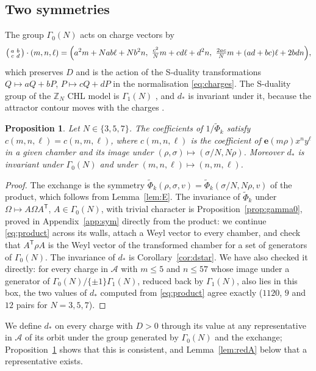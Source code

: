 \documentclass[11pt]{amsart}
\numberwithin{equation}{section}
\theoremstyle{plain}
\newtheorem{prop}[thm]{Proposition}
\theoremstyle{definition}
\theoremstyle{remark}
\newcommand{\Z}{\mathbb{Z}}
\newcommand{\cA}{\mathcal{A}}
\newcommand{\e}{\mathbf{e}}
\newcommand{\tPhi}{\widetilde{\Phi}}
\newcommand{\sm}[4]{\left(\begin{smallmatrix}#1&#2\\#3&#4\end{smallmatrix}\right)}
\begin{document}
\subsection{Two symmetries}
The group $\Gamma_0(N)$ acts on charge vectors by
\begin{equation}\label{eq:action}
\sm abcd\cdot(m,n,\ell)=\Bigl(a^2m+Nab\ell+Nb^2n,\ \tfrac{c^2}{N}m+cd\ell+d^2n,\ \tfrac{2ac}{N}m+(ad+bc)\ell+2bdn\Bigr),
\end{equation}
which preserves $D$ and is the action of the S-duality transformations $Q\mapsto aQ+bP$, $P\mapsto cQ+dP$ in the normalisation \eqref{eq:charges}. The S-duality group of the $\Z_N$ CHL model is $\Gamma_1(N)$ \cite{JS06}, and $d_*$ is invariant under it, because the attractor contour moves with the charges \cite{Sen08,BSS25}.

\begin{prop}\label{prop:sym}
Let $N\in\{3,5,7\}$. The coefficients of $1/\tPhi_k$ satisfy $c(m,n,\ell)=c(n,m,\ell)$, where $c(m,n,\ell)$ is the coefficient of $\e(m\rho)x^ny^\ell$ in a given chamber and its image under $(\rho,\sigma)\mapsto(\sigma/N,N\rho)$. Moreover $d_*$ is invariant under $\Gamma_0(N)$ and under $(m,n,\ell)\mapsto(n,m,\ell)$.
\end{prop}

\begin{proof}
The exchange is the symmetry $\tPhi_k(\rho,\sigma,v)=\tPhi_k(\sigma/N,N\rho,v)$ of the product, which follows from Lemma~\ref{lem:E}. The invariance of $\tPhi_k$ under $\Omega\mapsto A\Omega A^{\mathsf T}$, $A\in\Gamma_0(N)$, with trivial character is Proposition~\ref{prop:gamma0}, proved in Appendix~\ref{app:sym} directly from the product: we continue \eqref{eq:product} across its walls, attach a Weyl vector to every chamber, and check that $A^{\mathsf T}\rho A$ is the Weyl vector of the transformed chamber for a set of generators of $\Gamma_0(N)$. The invariance of $d_*$ is Corollary~\ref{cor:dstar}. We have also checked it directly: for every charge in $\cA$ with $m\le5$ and $n\le57$ whose image under a generator of $\Gamma_0(N)/\{\pm1\}\Gamma_1(N)$, reduced back by $\Gamma_1(N)$, also lies in this box, the two values of $d_*$ computed from \eqref{eq:product} agree exactly ($1120$, $9$ and $12$ pairs for $N=3,5,7$).
\end{proof}

We define $d_*$ on every charge with $D>0$ through its value at any representative in $\cA$ of its orbit under the group generated by $\Gamma_0(N)$ and the exchange; Proposition~\ref{prop:sym} shows that this is consistent, and Lemma~\ref{lem:redA} below that a representative exists.
\end{document}
